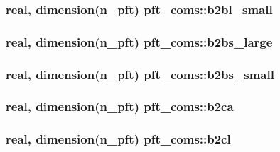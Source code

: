\subsubsection[{b2bl\+\_\+small}]{\setlength{\rightskip}{0pt plus 5cm}real, dimension(n\+\_\+pft) pft\+\_\+coms\+::b2bl\+\_\+small}\label{namespacepft__coms_ab0d33f3125e1ddd008763f955beceb8d}
\hypertarget{namespacepft__coms_aed3d2b057ee3fbf66a115868344eaa33}{}
\subsubsection[{b2bs\+\_\+large}]{\setlength{\rightskip}{0pt plus 5cm}real, dimension(n\+\_\+pft) pft\+\_\+coms\+::b2bs\+\_\+large}\label{namespacepft__coms_aed3d2b057ee3fbf66a115868344eaa33}
\hypertarget{namespacepft__coms_a184732d6139803d34ee55b42fb921695}{}
\subsubsection[{b2bs\+\_\+small}]{\setlength{\rightskip}{0pt plus 5cm}real, dimension(n\+\_\+pft) pft\+\_\+coms\+::b2bs\+\_\+small}\label{namespacepft__coms_a184732d6139803d34ee55b42fb921695}
\hypertarget{namespacepft__coms_a2380072ccb1b4557283c4f7d44398c9c}{}
\subsubsection[{b2ca}]{\setlength{\rightskip}{0pt plus 5cm}real, dimension(n\+\_\+pft) pft\+\_\+coms\+::b2ca}\label{namespacepft__coms_a2380072ccb1b4557283c4f7d44398c9c}
\hypertarget{namespacepft__coms_a382f054406a23a234b101ebf06ff6d5c}{}
\subsubsection[{b2cl}]{\setlength{\rightskip}{0pt plus 5cm}real, dimension(n\+\_\+pft) pft\+\_\+coms\+::b2cl}\label{namespacepft__coms_a382f054406a23a234b101ebf06ff6d5c}
\hypertarget{namespacepft__coms_a5c7b374e94930d3266444e1ef0539447}{}
